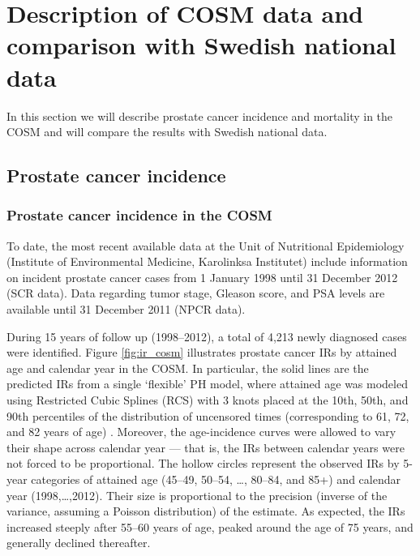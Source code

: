 %

\section{Description of COSM data and comparison with Swedish national data}
\label{sec:materialsepi}

In this section we will describe prostate cancer incidence and mortality in the COSM and will compare the results with Swedish national data. 

\subsection{Prostate cancer incidence}
\label{section:materials_incpca}

\subsubsection{Prostate cancer incidence in the COSM}
 
To date, the most recent available data at the Unit of Nutritional Epidemiology (Institute of Environmental Medicine, Karolinksa Institutet) include information on incident prostate cancer cases from 1 January 1998 until 31 December 2012 (SCR data). Data regarding tumor stage, Gleason score, and PSA levels are available until 31 December 2011 (NPCR data).

During 15 years of follow up (1998--2012), a total of 4,213 newly diagnosed cases were identified. Figure \ref{fig:ir_cosm} illustrates prostate cancer IRs by attained age and calendar year in the COSM. In particular, the solid lines are the predicted IRs from a single `flexible' PH model, where attained age was modeled using Restricted Cubic Splines (RCS) with 3 knots placed at the 10th, 50th, and 90th percentiles of the distribution of uncensored times (corresponding to 61, 72, and 82 years of age) \citep{harrell_regression_2001}. Moreover, the age-incidence curves were allowed to vary their shape across calendar year --- that is, the IRs between calendar years were not forced to be proportional. The hollow circles represent the observed IRs by 5-year categories of attained age (45--49, 50--54, \ldots, 80--84, and 85+) and calendar year (1998,\ldots,2012). Their size is proportional to the precision (inverse of the variance, assuming a Poisson distribution) of the estimate. As expected, the IRs increased steeply after 55--60 years of age, peaked around the age of 75 years, and generally declined thereafter. 

